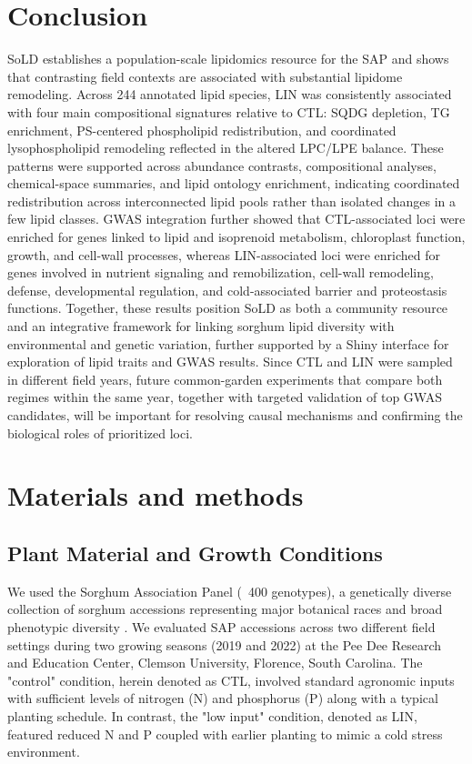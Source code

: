 \documentclass[9pt,twocolumn,twoside]{rilabRxiv}
\begin{document}
\section*{Conclusion}

SoLD establishes a population-scale lipidomics resource for the SAP and shows that contrasting field contexts are associated with substantial lipidome remodeling. Across 244 annotated lipid species, LIN was consistently associated with four main compositional signatures relative to CTL: SQDG depletion, TG enrichment, PS-centered phospholipid redistribution, and coordinated lysophospholipid remodeling reflected in the altered LPC/LPE balance. These patterns were supported across abundance contrasts, compositional analyses, chemical-space summaries, and lipid ontology enrichment, indicating coordinated redistribution across interconnected lipid pools rather than isolated changes in a few lipid classes. GWAS integration further showed that CTL-associated loci were enriched for genes linked to lipid and isoprenoid metabolism, chloroplast function, growth, and cell-wall processes, whereas LIN-associated loci were enriched for genes involved in nutrient signaling and remobilization, cell-wall remodeling, defense, developmental regulation, and cold-associated barrier and proteostasis functions. Together, these results position SoLD as both a community resource and an integrative framework for linking sorghum lipid diversity with environmental and genetic variation, further supported by a Shiny interface for exploration of lipid traits and GWAS results. Since CTL and LIN were sampled in different field years, future common-garden experiments that compare both regimes within the same year, together with targeted validation of top GWAS candidates, will be important for resolving causal mechanisms and confirming the biological roles of prioritized loci.


\section*{Materials and methods}

\subsection*{Plant Material and Growth Conditions}
We used the Sorghum Association Panel (~400 genotypes), a genetically diverse collection of sorghum accessions representing major botanical races and broad phenotypic diversity \citep{Casa2008CommunityResourcesSorghum, Boatwright2022}. We evaluated SAP accessions across two different field settings during two growing seasons (2019 and 2022) at the Pee Dee Research and Education Center, Clemson University, Florence, South Carolina. The "control" condition, herein denoted as CTL, involved standard agronomic inputs with sufficient levels of nitrogen (N) and phosphorus (P) along with a typical planting schedule. In contrast, the "low input" condition, denoted as LIN,  featured reduced N and P coupled with earlier planting to mimic a cold stress environment.
\end{document}
